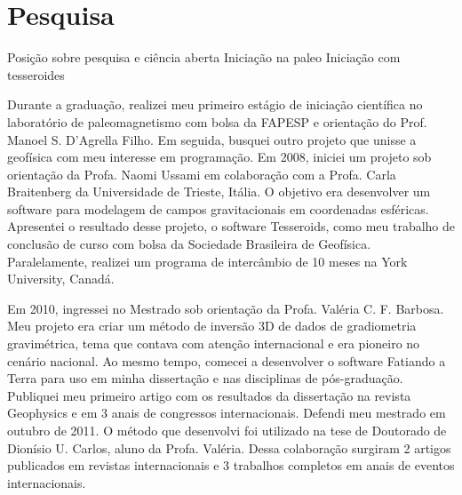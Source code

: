 \section{Pesquisa}

\citet{uieda2016a}

Posição sobre pesquisa e ciência aberta
Iniciação na paleo
Iniciação com tesseroides

Durante a graduação, realizei meu primeiro estágio de iniciação científica no
laboratório de paleomagnetismo com bolsa da FAPESP e orientação do Prof. Manoel
S. D'Agrella Filho. Em seguida, busquei outro projeto que unisse a geofísica
com meu interesse em programação. Em 2008, iniciei um projeto sob orientação da
Profa. Naomi Ussami em colaboração com a Profa. Carla Braitenberg da
Universidade de Trieste, Itália. O objetivo era desenvolver um software para
modelagem de campos gravitacionais em coordenadas esféricas. Apresentei o
resultado desse projeto, o software Tesseroids, como meu trabalho de conclusão
de curso com bolsa da Sociedade Brasileira de Geofísica. Paralelamente,
realizei um programa de intercâmbio de 10 meses na York University, Canadá.

Em 2010, ingressei no Mestrado sob orientação da Profa. Valéria C. F. Barbosa.
Meu projeto era criar um método de inversão 3D de dados de gradiometria
gravimétrica, tema que contava com atenção internacional e era pioneiro no
cenário nacional. Ao mesmo tempo, comecei a desenvolver o software Fatiando a
Terra para uso em minha dissertação e nas disciplinas de pós-graduação.
Publiquei meu primeiro artigo com os resultados da dissertação na revista
Geophysics e em 3 anais de congressos internacionais. Defendi meu mestrado em
outubro de 2011. O método que desenvolvi foi utilizado na tese de Doutorado de
Dionísio U. Carlos, aluno da Profa. Valéria. Dessa colaboração surgiram 2
artigos publicados em revistas internacionais e 3 trabalhos completos em anais
de eventos internacionais.

